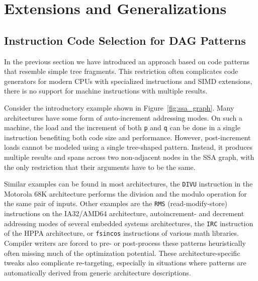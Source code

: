\section{Extensions and Generalizations}

\subsection{Instruction Code Selection for DAG Patterns}
\label{sec:dag_patterns}
In the previous section we have introduced an approach based on code
patterns that resemble simple tree fragments. This restriction often
complicates code generators for modern CPUs with specialized
instructions and SIMD extensions, \eg there is no support for
machine instructions with multiple results.

Consider the introductory example shown
in Figure~\ref{fig:ssa_graph}. Many architectures have some form of
auto-increment addressing modes. On such a machine, the load and the
increment of both \texttt{p} and \texttt{q} can be done in a single
instruction benefiting both code size and performance. However,
post-increment loads cannot be modeled using a single tree-shaped
pattern. Instead, it produces multiple results and spans across two
non-adjacent nodes in the SSA graph, with the only restriction that
their arguments have to be the same.

Similar examples can be found in most architectures, \eg the
\texttt{DIVU} instruction in the Motorola 68K architecture performs
the division and the modulo operation for the same pair of
inputs. Other examples are the \texttt{RMS} (read-modify-store)
instructions on the IA32/AMD64 architecture, autoincrement- and
decrement addressing modes of several embedded systems architectures,
the \texttt{IRC} instruction of the HPPA architecture, or
\texttt{fsincos} instructions of various math libraries. Compiler
writers are forced to pre- or post-process these patterns
heuristically often missing much of the optimization potential. 
These architecture-specific tweaks also complicate
re-targeting, especially in situations where patterns are
automatically derived from generic architecture descriptions.


